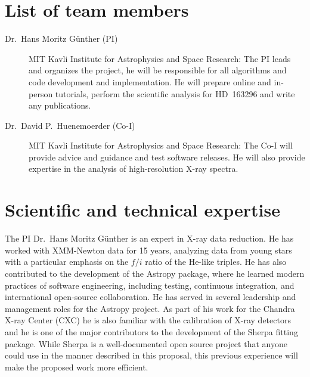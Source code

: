\documentclass[fleqn,12pt,onecolumn]{SelfArx} %
\begin{document}
\flushbottom %

\maketitle %

\thispagestyle{empty} %

\setcounter{tocdepth}{1}
\tableofcontents


\section{List of team members}
\begin{description}
    \item[Dr.\ Hans Moritz G\"unther (PI)] MIT Kavli Institute for Astrophysics and Space Research: The PI leads and organizes the project, he will be responsible for all algorithms and code development and implementation. He will prepare online and in-person tutorials, perform the scientific analysis for HD~163296 and write any publications.
    \item[Dr.\ David P.\ Huenemoerder (Co-I)] MIT Kavli Institute for Astrophysics and Space Research: The Co-I will provide advice and guidance and test software releases. He will also provide expertise in the analysis of high-resolution X-ray spectra.
\end{description}


\section{Scientific and technical expertise}
The PI Dr.\ Hans Moritz G\"unther is an expert in X-ray data reduction. He has worked with XMM-Newton data for 15 years, analyzing data from young stars with a particular emphasis on the $f/i$ ratio of the He-like triples.
He has also contributed to the development of the Astropy package, where he learned modern practices of software engineering, including testing, continuous integration, and international open-source collaboration. He has served in several leadership and management roles for the Astropy project. As part of his work for the Chandra X-ray Center (CXC) he is also familiar with the calibration of X-ray detectors and he is one of the major contributors to the development of the Sherpa fitting package. While Sherpa is a well-documented open source project that anyone could use in the manner described in this proposal, this previous experience will make the proposed work more efficient.
\end{document}
